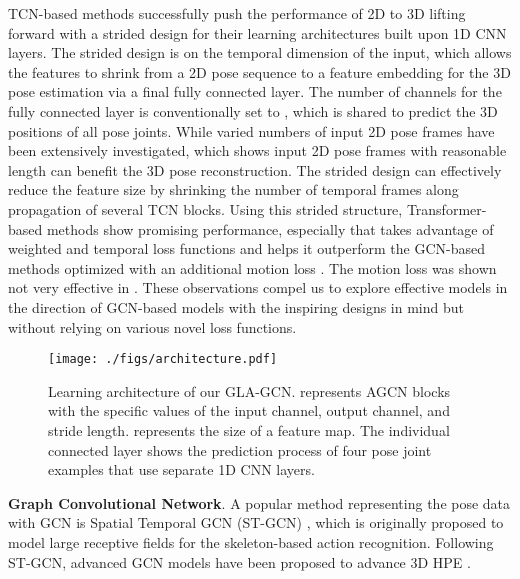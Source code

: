 \documentclass[10pt,twocolumn,letterpaper]{article}
\begin{document}
TCN-based methods \cite{RN012, RN013} successfully push the performance of 2D to 3D lifting forward with a strided design for their learning architectures built upon 1D CNN layers. The strided design is on the temporal dimension of the input, which allows the features to shrink from a 2D pose sequence to a feature embedding for the 3D pose estimation via a final fully connected layer. The number of channels for the fully connected layer is conventionally set to , which is shared to predict the 3D positions of all pose joints. While varied numbers of input 2D pose frames have been extensively investigated, which shows input 2D pose frames with reasonable length can benefit the 3D pose reconstruction. The strided design can effectively reduce the feature size by shrinking the number of temporal frames along propagation of several TCN blocks. Using this strided structure, Transformer-based methods \cite{li2022exploiting, zhang2022mixste} show promising performance, especially \cite{zhang2022mixste} that takes advantage of weighted and temporal loss functions and helps it outperform the GCN-based methods optimized with an additional motion loss \cite{RN014, hu2021conditional}. The motion loss was shown not very effective in \cite{zhang2022mixste}. These observations compel us to explore effective models in the direction of GCN-based models with the inspiring designs in mind but without relying on various novel loss functions.

\begin{figure*}
	\begin{center}
		\texttt{[image: ./figs/architecture.pdf]}
	\end{center}
 \vspace{-8pt}
	\caption{Learning architecture of our GLA-GCN.  represents AGCN blocks with the specific values of the input channel, output channel, and stride length.  represents the size of a feature map. The individual connected layer shows the prediction process of four pose joint examples that use separate 1D CNN layers. }
	\label{fig:architecture_SAGCN}
  \vspace{-5pt}
\end{figure*}

\noindent \textbf{Graph Convolutional Network}.
A popular method representing the pose data with GCN is Spatial Temporal GCN (ST-GCN) \cite{RN026}, which is originally proposed to model large receptive fields for the skeleton-based action recognition. Following ST-GCN, advanced GCN models have been proposed to advance 3D HPE \cite{RN029, RN018, RN020,RN014}. 
\end{document}
